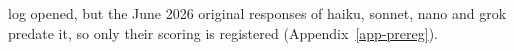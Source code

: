 log opened, but the June 2026 original responses of haiku, sonnet, nano and
grok predate it, so only their scoring is registered
(Appendix~\ref{app-prereg}).
